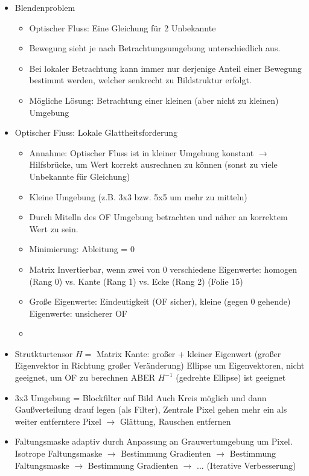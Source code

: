 \documentclass{report}
\begin{document}
\begin{itemize}
		\item Blendenproblem
		\begin{itemize}
			\item Optischer Fluss: Eine Gleichung für 2 Unbekannte
			\item Bewegung sieht je nach Betrachtungsumgebung unterschiedlich aus.
			\item Bei lokaler Betrachtung kann immer nur derjenige Anteil einer Bewegung bestimmt werden, welcher senkrecht zu Bildstruktur erfolgt.
			\item Mögliche Lösung: Betrachtung einer kleinen (aber nicht zu kleinen) Umgebung
		\end{itemize}
		
		\item Optischer Fluss: Lokale Glattheitsforderung
		\begin{itemize}
			\item Annahme: Optischer Fluss ist in kleiner Umgebung konstant
			\newline $\rightarrow$ Hilfsbrücke, um Wert korrekt ausrechnen zu können (sonst zu viele Unbekannte für Gleichung)
			\item Kleine Umgebung (z.B. 3x3 bzw. 5x5 um mehr zu mitteln)
			\item Durch Mitelln des OF Umgebung betrachten und näher an korrektem Wert zu sein.
			\item Minimierung: Ableitung = 0
			\item Matrix Invertierbar, wenn zwei von 0 verschiedene Eigenwerte: homogen (Rang 0) vs. Kante (Rang 1) vs. Ecke (Rang 2) (Folie 15)
			\item Große Eigenwerte: Eindeutigkeit (OF sicher), kleine (gegen 0 gehende) Eigenwerte: unsicherer OF
			
			
			\item 
		\end{itemize}
		
		\item Strutkturtensor $H =$ Matrix
		Kante: großer + kleiner Eigenwert (großer Eigenvektor in Richtung großer Veränderung)
		Ellipse um Eigenvektoren, nicht geeignet, um OF zu berechnen
		ABER $H^{-1}$ (gedrehte Ellipse) ist geeignet
		
		\item 3x3 Umgebung = Blockfilter auf Bild
		Auch Kreis möglich und dann Gaußverteilung drauf legen (als Filter), Zentrale Pixel gehen mehr ein als weiter entferntere Pixel $\rightarrow$ Glättung, Rauschen entfernen
		
		\item Faltungsmaske adaptiv durch Anpassung an Grauwertumgebung um Pixel.
		Isotrope Faltungsmaske $\rightarrow$ Bestimmung Gradienten $\rightarrow$ Bestimmung Faltungsmaske $\rightarrow$ Bestimmung Gradienten $\rightarrow$ ... (Iterative Verbesserung)
		

\end{itemize}
\end{document}
